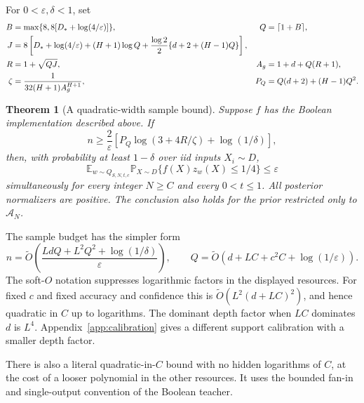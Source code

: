 \documentclass[11pt]{article}
\newtheorem{theorem}{Theorem}
\newcommand{\E}{\mathbb E}
\newcommand{\Prb}{\mathbb P}
\begin{document}
For $0<\varepsilon,\delta<1$, set
\begin{align}
 B&=\max\{8,8[D_*+\log(4/\varepsilon)]\},
 &Q&=\lceil1+B\rceil,\notag\\
 J&=8\left[D_*+\log(4/\varepsilon)+(H+1)\log Q
       +\frac{\log2}{2}\{d+2+(H-1)Q\}\right],\notag\\
 R&=1+\sqrt{QJ},
 &A_g&=1+d+Q(R+1),\notag\\
 \zeta&=\frac1{32(H+1)A_g^{H+1}},
 &P_Q&=Q(d+2)+(H-1)Q^2.\label{eq:budget}
\end{align}

\begin{theorem}[A quadratic-width sample bound]\label{thm:main}
Suppose $f$ has the Boolean implementation described above. If
\begin{equation}\label{eq:sample}
 n\ge\frac2\varepsilon\left[
 P_Q\log(3+4R/\zeta)+\log(1/\delta)\right],
\end{equation}
then, with probability at least $1-\delta$ over iid inputs $X_i\sim D$,
\[
 \E_{w\sim Q_{S,N,t,c}}\Prb_{X\sim D}
       \{f(X)z_w(X)\le1/4\}\le\varepsilon
\]
simultaneously for every integer $N\ge C$ and every $0<t\le1$.
All posterior normalizers are positive. The conclusion also holds for the
prior restricted only to $\mathcal A_N$.
\end{theorem}

The sample budget has the simpler form
\begin{equation}\label{eq:rate}
 n=\widetilde O\left(
 \frac{LdQ+L^2Q^2+\log(1/\delta)}{\varepsilon}\right),
 \qquad
 Q=\widetilde O\left(d+LC+c^2C+\log(1/\varepsilon)\right).
\end{equation}
The soft-$O$ notation suppresses logarithmic factors in the displayed
resources. For fixed $c$ and fixed accuracy and confidence this is
$\widetilde O(L^2(d+LC)^2)$, and hence quadratic in $C$ up to logarithms.
The dominant depth factor when $LC$ dominates $d$ is $L^4$.
Appendix~\ref{app:calibration} gives a different support calibration with
a smaller depth factor.

There is also a literal quadratic-in-$C$ bound with no hidden logarithms
of $C$, at the cost of a looser polynomial in the other resources. It uses
the bounded fan-in and single-output convention of the Boolean teacher.
\end{document}
